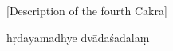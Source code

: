 \begin{ekdosis}
   \bigskip
    \centerline{\textrm{\small{[Description of the fourth Cakra]}}}
    \bigskip
  \begin{prose}
%
     hṛdayamadhye dvādaśadalaṃ
\end{prose}
\end{ekdosis}
